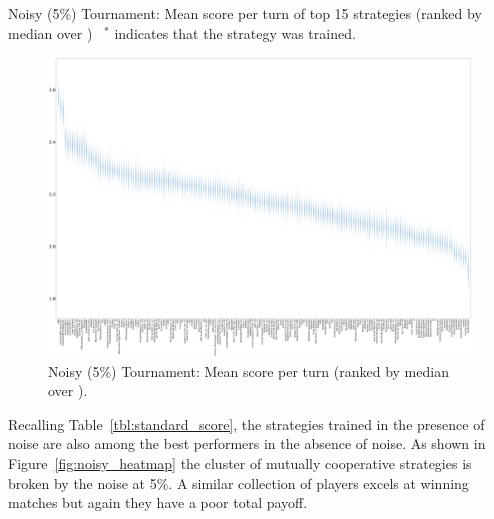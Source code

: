\documentclass{article}
\begin{document}
\begin{table}[!hbtp]
    \centering
        
        \caption{Noisy (5\%) Tournament: Mean score per turn of top 15 strategies
        (ranked by median over
        \protecttournaments)
        ~$^{*}$ indicates that the strategy was trained.}
        \label{tbl:noisy_score}
\end{table}


\begin{landscape}
    \begin{figure}[!hbtp]
        \centering
        \includegraphics[width=\paperwidth]{./assets/noisy_scores_boxplots.pdf}
        \caption{Noisy (5\%) Tournament: Mean score per turn (ranked by median
        over
        \protecttournaments).}
        \label{fig:noisy_score}
    \end{figure}
\end{landscape}


Recalling Table~\ref{tbl:standard_score}, the strategies trained in the presence
of noise are also among the best performers in the absence of noise. As shown in
Figure~\ref{fig:noisy_heatmap} the cluster of mutually cooperative strategies is
broken by the noise at 5\%. A similar collection of players excels at winning
matches but again they have a poor total payoff.
\end{document}
